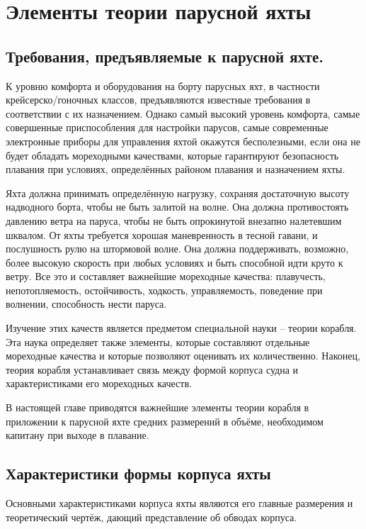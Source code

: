 \chapter{Элементы теории парусной яхты}

\section{Требования, предъявляемые к парусной яхте.}

К уровню комфорта и оборудования на борту парусных яхт, в частности
крейсерско\-/гоночных классов, предъявляются известные требования в
соответствии с их назначением. Однако самый высокий уровень комфорта,
самые совершенные приспособления для настройки парусов, самые
современные электронные приборы для управления яхтой окажутся
бесполезными, если она не будет обладать мореходными качествами,
которые гарантируют безопасность плавания при условиях, определённых
районом плавания и назначением яхты.

Яхта должна принимать определённую нагрузку, сохраняя достаточную
высоту надводного борта, чтобы не быть залитой на волне. Она должна
противостоять давлению ветра на паруса, чтобы не быть опрокинутой
внезапно налетевшим шквалом. От яхты требуется хорошая маневренность в
тесной гавани, и послушность рулю на штормовой волне. Она должна
поддерживать, возможно, более высокую скорость при любых условиях и
быть способной идти круто к ветру. Все это и составляет важнейшие
мореходные качества: плавучесть, непотопляемость, остойчивость,
ходкость, управляемость, поведение при волнении, способность нести
паруса.

Изучение этих качеств является предметом специальной науки \--- теории
корабля. Эта наука определяет также элементы, которые составляют
отдельные мореходные качества и которые позволяют оценивать их
количественно. Наконец, теория корабля устанавливает связь между
формой корпуса судна и характеристиками его мореходных качеств.

В настоящей главе приводятся важнейшие элементы теории корабля в
приложении к парусной яхте средних размерений в объёме, необходимом
капитану при выходе в плавание.

\section{Характеристики формы корпуса яхты}

Основными характеристиками
корпуса яхты являются его главные размерения
и теоретический чертёж, дающий
представление об обводах корпуса.

